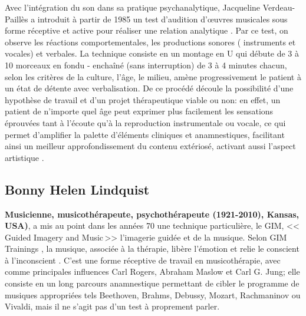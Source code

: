 Avec l'intégration du son dans sa pratique psychanalytique,
Jacqueline Verdeau-Paillès a introduit  à partir de 1985  un test d'audition d'\oe uvres musicales
sous forme réceptive et active pour réaliser
une relation analytique \autocite{verdeau-pailles:bilan}.
Par ce test, on
observe les réactions comportementales, les productions sonores (
instruments et vocales) et verbales. La technique consiste en un montage en U qui débute de 3 à 10
morceaux en fondu - enchaîné (sans interruption) de 3 à 4 minutes chacun, selon les
critères de la culture, l'âge, le milieu,
amène progressivement le patient à un état de détente
avec verbalisation. De ce procédé découle la possibilité
d'une hypothèse de
travail et d'un projet thérapeutique viable ou non:
en effet, un patient de n'importe quel âge peut exprimer plus facilement les
sensations éprouvées tant à l'écoute qu'à la reproduction
instrumentale ou vocale, ce qui permet d'amplifier la palette d'éléments
cliniques et anamnestiques, facilitant ainsi un meilleur approfondissement du
contenu extériosé, activant aussi l'aspect artistique
\autocite{verdeau_expression}.



\subsection{Bonny Helen Lindquist}

\textbf{ Musicienne, musicothérapeute, psychothérapeute (1921-2010), Kansas, USA)},
a mis au point dans les années 70
une technique particulière, le GIM, <<\,Guided Imagery and Music\,>>
l'imagerie guidée et de la musique. Selon GIM
Trainings \autocite{gim_site}, la
musique, associée à la thérapie, libère l'émotion et relie le
conscient à l'inconscient \autocite{bonny_gim}.
 C'est une forme réceptive de travail
 en musicothérapie, avec comme principales influences Carl Rogers,
 Abraham Maslow  \autocite{maslow-key}
et Carl G. Jung;
elle  consiste en un long parcours  anamnestique permettant de cibler le programme de musiques appropriées tels Beethoven, Brahms, Debussy,
Mozart, Rachmaninov ou Vivaldi, mais il ne s'agit pas d'un test à proprement parler.

